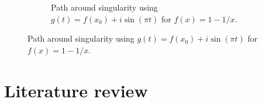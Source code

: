 \documentclass{book}
\begin{document}
\begin{figure}
\begin{subfigure}{0.5\textwidth}
		\caption{Path around singularity using $g(t) = f(x_0) + i \sin(\pi t)$ for $f(x) = 1 - 1/x$.}
	\end{subfigure}
\end{figure}

\section{Literature review}

%
\end{document}
